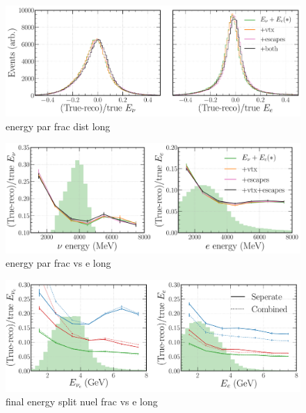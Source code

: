 \begin{figure} %
    \includegraphics[width=\textwidth]{diagrams/6-cvn/chipsnet/energy_par_frac_dist.pdf}
    \caption[energy par frac dist short]
    {energy par frac dist long}
    \label{fig:energy_par_frac_dist}
\end{figure}

\begin{figure} %
    \includegraphics[width=\textwidth]{diagrams/6-cvn/chipsnet/energy_par_frac_vs_e.pdf}
    \caption[energy par frac vs e short]
    {energy par frac vs e long}
    \label{fig:energy_par_frac_vs_e}
\end{figure}

\begin{figure} %
    \includegraphics[width=\textwidth]{diagrams/6-cvn/chipsnet/final_energy_split_nuel_frac_vs_e.pdf}
    \caption[final energy split nuel frac vs e short]
    {final energy split nuel frac vs e long}
    \label{fig:final_energy_split_nuel_frac_vs_e}
\end{figure}

